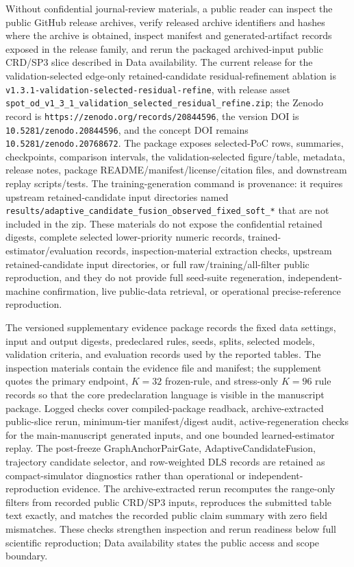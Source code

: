 \documentclass{article}
\begin{document}
Without confidential journal-review materials, a public reader can inspect the public GitHub release archives, verify released archive identifiers and hashes where the archive is obtained, inspect manifest and generated-artifact records exposed in the release family, and rerun the packaged archived-input public CRD/SP3 slice described in Data availability. The current release for the validation-selected edge-only retained-candidate residual-refinement ablation is \texttt{v1.3.1-validation-selected-residual-refine}, with release asset \nolinkurl{spot_od_v1_3_1_validation_selected_residual_refine.zip}; the Zenodo record is \nolinkurl{https://zenodo.org/records/20844596}, the version DOI is \nolinkurl{10.5281/zenodo.20844596}, and the concept DOI remains \nolinkurl{10.5281/zenodo.20768672}. The package exposes selected-PoC rows, summaries, checkpoints, comparison intervals, the validation-selected figure/table, metadata, release notes, package README/manifest/license/citation files, and downstream replay scripts/tests. The training-generation command is provenance: it requires upstream retained-candidate input directories named \texttt{results/adaptive\_candidate\_fusion\_observed\_fixed\_soft\_*} that are not included in the zip. These materials do not expose the confidential retained digests, complete selected lower-priority numeric records, trained-estimator/evaluation records, inspection-material extraction checks, upstream retained-candidate input directories, or full raw/training/all-filter public reproduction, and they do not provide full seed-suite regeneration, independent-machine confirmation, live public-data retrieval, or operational precise-reference reproduction.

The versioned supplementary evidence package records the fixed data settings, input and output digests, predeclared rules, seeds, splits, selected models, validation criteria, and evaluation records used by the reported tables. The inspection materials contain the evidence file and manifest; the supplement quotes the primary endpoint, $K=32$ frozen-rule, and stress-only $K=96$ rule records so that the core predeclaration language is visible in the manuscript package. Logged checks cover compiled-package readback, archive-extracted public-slice rerun, minimum-tier manifest/digest audit, active-regeneration checks for the main-manuscript generated inputs, and one bounded learned-estimator replay. The post-freeze GraphAnchorPairGate, AdaptiveCandidateFusion, trajectory candidate selector, and row-weighted DLS records are retained as compact-simulator diagnostics rather than operational or independent-reproduction evidence. The archive-extracted rerun recomputes the range-only filters from recorded public CRD/SP3 inputs, reproduces the submitted table text exactly, and matches the recorded public claim summary with zero field mismatches. These checks strengthen inspection and rerun readiness below full scientific reproduction; Data availability states the public access and scope boundary.
\end{document}

